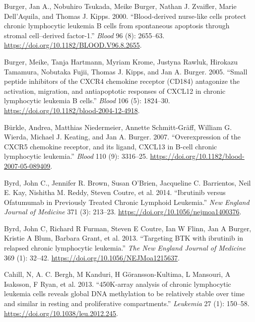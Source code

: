 \documentclass[11pt, a4paper, twosided]{book}
\newenvironment{CSLReferences}%
  {}%
  {\par}
\begin{document}
\begin{CSLReferences}{1}{0}
\leavevmode{}%
Burger, Jan A., Nobuhiro Tsukada, Meike Burger, Nathan J. Zvaifler, Marie Dell'Aquila, and Thomas J. Kipps. 2000. {``{Blood-derived nurse-like cells protect chronic lymphocytic leukemia B cells from spontaneous apoptosis through stromal cell--derived factor-1}.''} \emph{Blood} 96 (8): 2655--63. \url{https://doi.org/10.1182/BLOOD.V96.8.2655}.

\leavevmode{}%
Burger, Meike, Tanja Hartmann, Myriam Krome, Justyna Rawluk, Hirokazu Tamamura, Nobutaka Fujii, Thomas J. Kipps, and Jan A. Burger. 2005. {``{Small peptide inhibitors of the CXCR4 chemokine receptor (CD184) antagonize the activation, migration, and antiapoptotic responses of CXCL12 in chronic lymphocytic leukemia B cells}.''} \emph{Blood} 106 (5): 1824--30. \url{https://doi.org/10.1182/blood-2004-12-4918}.

\leavevmode{}%
Bürkle, Andrea, Matthias Niedermeier, Annette Schmitt-Gräff, William G. Wierda, Michael J. Keating, and Jan A. Burger. 2007. {``{Overexpression of the CXCR5 chemokine receptor, and its ligand, CXCL13 in B-cell chronic lymphocytic leukemia}.''} \emph{Blood} 110 (9): 3316--25. \url{https://doi.org/10.1182/blood-2007-05-089409}.

\leavevmode{}%
Byrd, John C., Jennifer R. Brown, Susan O'Brien, Jacqueline C. Barrientos, Neil E. Kay, Nishitha M. Reddy, Steven Coutre, et al. 2014. {``{Ibrutinib versus Ofatumumab in Previously Treated Chronic Lymphoid Leukemia}.''} \emph{New England Journal of Medicine} 371 (3): 213--23. \url{https://doi.org/10.1056/nejmoa1400376}.

\leavevmode{}%
Byrd, John C, Richard R Furman, Steven E Coutre, Ian W Flinn, Jan A Burger, Kristie A Blum, Barbara Grant, et al. 2013. {``{Targeting BTK with ibrutinib in relapsed chronic lymphocytic leukemia.}''} \emph{The New England Journal of Medicine} 369 (1): 32--42. \url{https://doi.org/10.1056/NEJMoa1215637}.

\leavevmode{}%
Cahill, N, A. C. Bergh, M Kanduri, H Göransson-Kultima, L Mansouri, A Isaksson, F Ryan, et al. 2013. {``{450K-array analysis of chronic lymphocytic leukemia cells reveals global DNA methylation to be relatively stable over time and similar in resting and proliferative compartments}.''} \emph{Leukemia} 27 (1): 150--58. \url{https://doi.org/10.1038/leu.2012.245}.


\end{CSLReferences}
\end{document}
